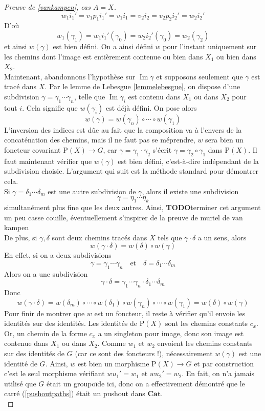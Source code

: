 \documentclass{article}
\renewcommand{\P}{\mathrm{P}}
\newcommand{\Cat}{\mathbf{Cat}}
\renewcommand{\Im}{\mathop{\mathrm{Im}}}
\theoremstyle{definition}
\theoremstyle{remark}
\newcommand{\todo}{\textbf{TODO}}
\begin{document}
\begin{proof}[Preuve de \ref{vankampen}, cas $A=X$]
    \[w_1 i_1' = v_1 p_1 i_1' = v_1 i_1 = v_2 i_2 = v_2 p_2 i_2' = w_2 i_2' \]
    D'où
    \[w_1(\gamma_1) = w_1 i_1' (\gamma_0) = w_2 i_2'(\gamma_0) = w_2(\gamma_2)\]
    et ainsi $w(\gamma)$ est bien défini. On a ainsi défini $w$ pour l'instant uniquement sur les chemins dont l'image est entièrement contenue ou bien dans $X_1$ ou bien dans $X_2$. \\
    Maintenant, abandonnons l'hypothèse sur $\Im \gamma$ et supposons seulement que $\gamma$ est tracé dans $X$. Par le lemme de Lebesgue \ref{lemmelebesgue}, on dispose d'une subdivision $\gamma = \gamma_1 \cdots \gamma_n$, telle que $\Im \gamma_i$ est contenu dans $X_1$ ou dans $X_2$ pour tout $i$. Cela signifie que $w(\gamma_i)$ est déjà défini. On pose alors
    \[w(\gamma) = w(\gamma_n) \circ \cdots \circ w(\gamma_1)\]
    L'inversion des indices est dûe au fait que la composition va à l'envers de la concaténation des chemins, mais il ne faut pas se méprendre, $w$ sera bien un foncteur covariant $\P(X) \to G$, car $\gamma = \gamma_1 \cdot \gamma_2$ s'écrit $\gamma = \gamma_2 \circ \gamma_1$ dans $\P(X)$. Il faut maintenant vérifier que $w(\gamma)$ est bien défini, c'est-à-dire indépendant de la subdivision choisie. L'argument qui suit est la méthode standard pour démontrer cela. \\
    Si $\gamma = \delta_1 \cdots \delta_m$ est une autre subdivision de $\gamma$, alors il existe une subdivision
    \[\gamma = \eta_1 \cdots \eta_k\]
    simultanément plus fine que les deux autres. Ainsi, \todo terminer cet argument un peu casse couille, éventuellement s'inspirer de la preuve de muriel de van kampen \\
    De plus, si $\gamma, \delta$ sont deux chemins tracés dans $X$ tels que $\gamma \cdot \delta$ a un sens, alors 
    \[w(\gamma \cdot \delta) = w(\delta) \circ w(\gamma)\]
    En effet, si on a deux subdivisions
    \[\gamma = \gamma_1 \cdots \gamma_n \quad \text{et} \quad \delta = \delta_1 \cdots \delta_m \]
    Alors on a une subdivision
    \[\gamma \cdot \delta = \gamma_1 \cdots \gamma_n \cdot \delta_1 \cdots \delta_m\]
    Donc
    \[w(\gamma \cdot \delta) = w(\delta_m) \circ \cdots \circ w(\delta_1) \circ w(\gamma_n) \circ \cdots \circ w(\gamma_1) = w(\delta) \circ w(\gamma)\]
    Pour finir de montrer que $w$ est un foncteur, il reste à vérifier qu'il envoie les identités sur des identités. Les identités de $\P(X)$ sont les chemins constants $c_x$. Or, un chemin de la forme $c_x$ a un singleton pour image, donc son image est contenue dans $X_1$ ou dans $X_2$. Comme $w_1$ et $w_2$ envoient les chemins constants sur des identités de $G$ (car ce sont des foncteurs !), nécessairement $w(\gamma)$ est une identité de $G$. Ainsi, $w$ est bien un morphisme $\P(X) \to G$ et par construction c'est le seul morphisme vérifiant $wu_1' = w_1$ et $wu_2' = w_2$. En fait, on n'a jamais utilisé que $G$ était un groupoïde ici, donc on a effectivement démontré que le carré (\ref{pushoutpaths}) était un pushout dans $\Cat$. \\

\end{proof}
\end{document}
